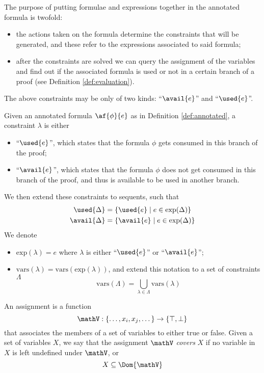 The purpose of putting formulae and expressions together in the annotated formula is twofold:
\begin{itemize}
	\item the actions taken on the formula determine the constraints that will be generated, and these refer to the expressions associated to said formula;
	\item after the constraints are solved we can query the assignment of the variables and find out if the associated formula is used or not in a certain branch of a proof (see Definition \ref{def:evaluation}).
\end{itemize}
The above constraints may be only of two kinds: ``$\avail{e}$'' and ``$\used{e}$''.
\begin{define}[Constraints]
	\label{def:constraints}
	Given an annotated formula $\af{\phi}{e}$ as in Definition \ref{def:annotated}, a constraint $\lambda$ is either
	\begin{itemize}
		\item ``$\used{e}$'', which states that the formula $\phi$ gets consumed in this branch of the proof;
		\item ``$\avail{e}$'', which states that the formula $\phi$ does not get consumed in this branch of the proof, and thus is available to be used in another branch.
	\end{itemize}
	We then extend these constraints to sequents, such that
	\begin{align*}
		\used{\Delta} &= \{ \used{e} \mid e \in \mathrm{exp}(\Delta) \} \\
		\avail{\Delta} &= \{ \avail{e} \mid e \in \mathrm{exp}(\Delta) \}
	\end{align*}
	We denote
	\begin{itemize}
		\item $\mathrm{exp}(\lambda) = e$ where $\lambda$ is either ``$\used{e}$'' or ``$\avail{e}$'';
		\item $\mathrm{vars}(\lambda) = \mathrm{vars}(\mathrm{exp}(\lambda))$, and extend this notation to a set of constraints $\Lambda$
			$$ \mathrm{vars}(\Lambda) = \bigcup_{\lambda \in \Lambda} \mathrm{vars}(\lambda) $$
	\end{itemize}
\end{define}
\begin{define}[Assignment]
	\label{def:assignment}
	An assignment is a function
	$$ \mathV : \{ \dots, x_i, x_j, \dots \} \rightarrow \{ \top, \bot \} $$
	that associates the members of a set of variables to either true or false.
	Given a set of variables $X$, we say that the assignment $\mathV$ \textit{covers} $X$ if no variable in $X$ is left undefined under $\mathV$, or
	$$ X \subseteq \Dom{\mathV} $$
\end{define}
